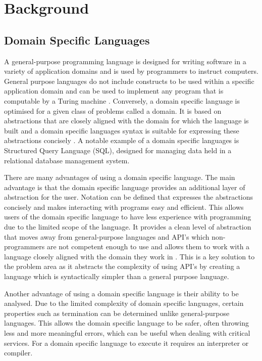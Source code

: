 \chapter{Background}

\section{Domain Specific Languages}

A general-purpose programming language is designed for writing software in a variety of application domains and is used by programmers to instruct computers. General purpose languages do not include constructs to be used within a specific application domain and can be used to implement any program that is computable by a Turing machine \cite{DslEngineering2013}. Conversely, a domain specific language is optimised for a given class of problems called a domain.  It is based on abstractions that are closely aligned with the domain for which the language is built and a domain specific languages syntax is suitable for expressing these abstractions concisely \cite{DslEngineering2013}. A notable example of a domain specific languages is Structured Query Language (SQL), designed for managing data held in a relational database management system. \newline \par

There are many advantages of using a domain specific language. The main advantage is that the domain specific language provides an additional layer of abstraction for the user. Notation can be defined that expresses the abstractions concisely and makes interacting with programs easy and efficient. This allows users of the domain specific language to have less experience with programming due to the limited scope of the language. It provides a clean level of abstraction that moves away from general-purpose languages and API’s which non-programmers are not competent enough to use and allows them to work with a language closely aligned with the domain they work in \cite{DslEngineering2013}. This is a key solution to the problem area as it abstracts the complexity of using API’s by creating a language which is syntactically simpler than a general purpose language. \newline \par

Another advantage of using a domain specific language is their ability to be analysed. Due to the limited complexity of domain specific languages, certain properties such as termination can be determined unlike general-purpose languages. This allows the domain specific language to be safer, often throwing less and more meaningful errors, which can be useful when dealing with critical services. For a domain specific language to execute it requires an interpreter or compiler.

